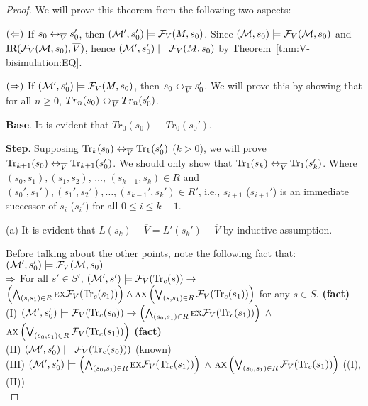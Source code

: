 \documentclass{article}
\begin{document}
\begin{proof}
 We will prove this theorem from the following two aspects:

 $(\Leftarrow)$ If $s_0 \leftrightarrow_{\overline V} s_0'$, then $({\cal M}',s_0') \models {\cal F}_V(M,s_0)$. Since $({\cal M}, s_0) \models {\cal F}_V({\cal M}, s_0)$ and $\textrm{IR}({\cal F}_V({\cal M}, s_0), \overline V)$, hence
 $({\cal M}',s_0') \models {\cal F}_V(M,s_0)$ by Theorem~\ref{thm:V-bisimulation:EQ}.

 $(\Rightarrow)$ If $({\cal M}',s_0') \models {\cal F}_V(M,s_0)$, then $s_0 \leftrightarrow_{\overline V} s_0'$. We will prove this by showing that for all $n \geq 0$, $Tr_n(s_0) \leftrightarrow_{\overline V} Tr_n(s_0')$.


 \textbf{Base}. It is evident that $Tr_0(s_0) \equiv Tr_0(s_0')$.

 \textbf{Step}. Supposing $\textrm{Tr}_k(s_0) \leftrightarrow_{\overline V} \textrm{Tr}_k(s_0')$ ($k > 0$), we will prove $\textrm{Tr}_{k+1}(s_0) \leftrightarrow_{\overline V} \textrm{Tr}_{k+1}(s_0')$. We should only show that $\textrm{Tr}_1(s_k) \leftrightarrow_{\overline V} \textrm{Tr}_1(s_k')$. Where $(s_0, s_1), (s_1, s_2)$, $\dots$, $(s_{k-1}, s_k) \in R$ and $(s_0', s_1'), (s_1', s_2'), \dots, (s_{k-1}', s_k') \in R'$, i.e., $s_{i+1}$ ($s_{i+1}'$) is an immediate successor of $s_i$ ($s_i'$) for all $0 \leq i \leq k-1$.

       (a) It is evident that $L(s_k) - \overline V = L'(s_k') - \overline V$ by inductive assumption.

       Before talking about the other points, note the following fact that:\\
       $({\cal M}',s_0') \models {\cal F}_V({\cal M},s_0)$\\
       $\Rightarrow$ For all $s'\in S'$, $({\cal M}', s')\models {\cal F}_V(\textrm{Tr}_c(s)) \rightarrow$ \\ $\left(\bigwedge_{(s,s_1)\in R} \textsc{e} \textsc{x} {\cal F}_V(\textrm{Tr}_c(s_1))\right)\wedge \textsc{a} \textsc{x} \left( \bigvee_{(s,s_1)\in R} {\cal F}_V(\textrm{Tr}_c(s_1))\right)$  for any $s\in S$.   \hfill  \textbf{(fact)}\\
       (I) $({\cal M}', s_0') \models {\cal F}_V(\textrm{Tr}_c(s_0)) \rightarrow \left(\bigwedge_{(s_0, s_1) \in R} \textsc{e} \textsc{x} {\cal F}_V(\textrm{Tr}_c(s_1))\right)$ $\wedge$ $\textsc{a} \textsc{x} \left(\bigvee_{(s_0, s_1) \in R} {\cal F}_V(\textrm{Tr}_c(s_1)) \right)$     \hfill  \textbf{(fact)}\\
         (II) $({\cal M}', s_0') \models {\cal F}_V(\textrm{Tr}_c(s_0)))$  \hfill  (known)\\
         (III) $({\cal M}', s_0') \models \left(\bigwedge_{(s_0, s_1) \in R} \textsc{e} \textsc{x} {\cal F}_V(\textrm{Tr}_c(s_1))\right)$ $\wedge$ $\textsc{a} \textsc{x} \left(\bigvee_{(s_0, s_1) \in R} {\cal F}_V(\textrm{Tr}_c(s_1)) \right)$  \hfill  ((I),(II))\\


\end{proof}
\end{document}
